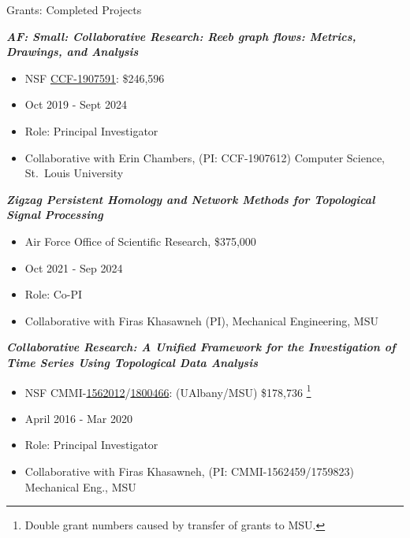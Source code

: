 \documentclass{resume} %
\begin{document}
\begin{rSection}{Grants: Completed Projects}

\textbf{\textit{AF: Small: Collaborative Research: Reeb graph flows: Metrics, Drawings, and Analysis}}
\vspace{-.1in}
\begin{itemize}{}{\leftmargin=0em}
   \itemsep -0.6em %
   \item
NSF \href{https://nsf.gov/awardsearch/showAward?AWD_ID=1907591}{CCF-1907591}:  \$246,596
\item
Oct 2019 - Sept 2024
   \item
Role: Principal Investigator
\item Collaborative with
  Erin Chambers, (PI: CCF-1907612) Computer Science, St.~Louis University

\end{itemize}
\textbf{\textit{Zigzag Persistent Homology and Network Methods for Topological Signal Processing}}
\vspace{-.1in}
\begin{itemize}{}{\leftmargin=0em}
   \itemsep -0.6em %
   \item Air Force Office of Scientific Research, \$375,000
\item
Oct 2021 - Sep 2024
   \item
Role: Co-PI
\item Collaborative with Firas Khasawneh (PI), Mechanical Engineering, MSU

\end{itemize}
\textbf{\textit{Collaborative Research: A Unified Framework for the Investigation of Time Series Using Topological Data Analysis}}
\vspace{-.1in}
\begin{itemize}{}{\leftmargin=0em}
   \itemsep -0.6em %
   \item
NSF CMMI-\href{https://nsf.gov/awardsearch/showAward?AWD_ID=1562012}{1562012}/\href{https://nsf.gov/awardsearch/showAward?AWD_ID=1800466}{1800466}: (UAlbany/MSU)  \$178,736 \footnote{Double grant numbers caused by transfer of grants to MSU.}
\item
April 2016 - Mar 2020
   \item
Role: Principal Investigator
\item Collaborative with
  Firas Khasawneh, (PI: CMMI-1562459/1759823) Mechanical Eng., MSU


\end{itemize}
\end{rSection}
\end{document}
